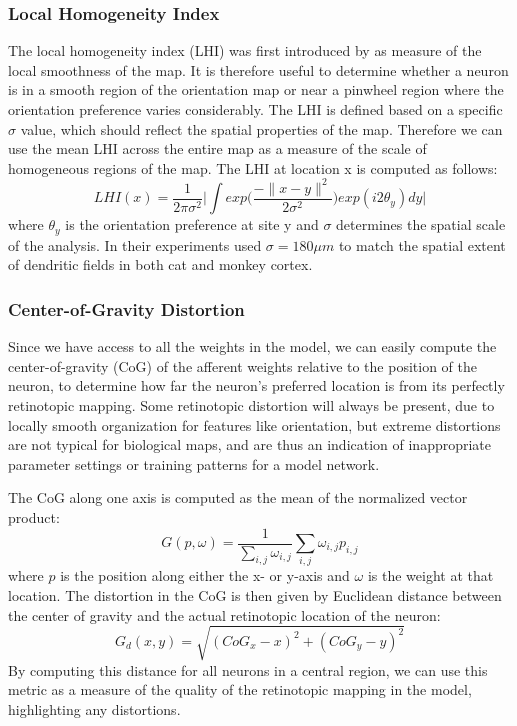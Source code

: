 \subsubsection*{Local Homogeneity Index}

The local homogeneity index (LHI) was first introduced by
\cite{Nauhaus2008} as measure of the local smoothness of the map. It
is therefore useful to determine whether a neuron is in a smooth
region of the orientation map or near a pinwheel region where the
orientation preference varies considerably. The LHI is defined based
on a specific $\sigma$ value, which should reflect the spatial
properties of the map. Therefore we can use the mean LHI across the
entire map as a measure of the scale of homogeneous regions of the
map. The LHI at location x is computed as follows:
\begin{equation}
  LHI(x) = \frac{1}{2\pi \sigma^2} \bigg\lvert \int
  exp\bigg(\frac{-\|x-y\|^2}{2\sigma^2}\bigg) exp(i2\theta_y) dy
  \bigg\rvert
\end{equation}
where $\theta_y$ is the orientation preference at site y and $\sigma$
determines the spatial scale of the analysis. In their experiments
\cite{Nauhaus2008} used $\sigma=180\mu m$ to match the spatial extent
of dendritic fields in both cat and monkey cortex.

\subsubsection*{Center-of-Gravity Distortion}

Since we have access to all the weights in the model, we can easily compute
the center-of-gravity (CoG) of the afferent weights relative to the
position of the neuron, to determine how far the neuron's preferred
location is from its perfectly retinotopic mapping.  Some retinotopic
distortion will always be present, due to locally smooth organization
for features like orientation, but extreme distortions are not typical
for biological maps, and are thus an indication of inappropriate
parameter settings or training patterns for a model network.

The CoG along one axis is computed as the mean of the normalized
vector product: 
\begin{equation}
  G(p, \omega) = \frac{1}{\sum_{i,j} \omega_{i, j}} \sum_{i,j} \omega_{i,j} p_{i,j}
\end{equation}
where $p$ is the position along either the x- or y-axis and $\omega$
is the weight at that location. The distortion in the CoG is then
given by Euclidean distance between the center of gravity and the
actual retinotopic location of the neuron:
\begin{equation}
  G_d(x, y) = \sqrt{(CoG_x-x)^2 + (CoG_y-y)^2}
\end{equation}
By computing this distance for all neurons in a central region, we can use
this metric as a measure of the quality of the retinotopic mapping in
the model, highlighting any distortions.

